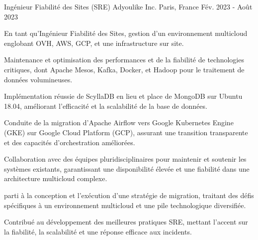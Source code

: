 \begin{cventries}
          \cventry
            {Ingénieur Fiabilité des Sites (SRE)} %
            {Adyoulike Inc.} %
            {Paris, France} %
            {Fév. 2023 - Août 2023} %
            {
              \begin{cvitems} %
                \item {En tant qu'Ingénieur Fiabilité des Sites, gestion d'un environnement multicloud englobant OVH, AWS, GCP, et une infrastructure sur site.}
                \item {Maintenance et optimisation des performances et de la fiabilité de technologies critiques, dont Apache Mesos, Kafka, Docker, et Hadoop pour le traitement de données volumineuses.}
                \item {Implémentation réussie de ScyllaDB en lieu et place de  MongoDB sur Ubuntu 18.04, améliorant l'efficacité et la scalabilité de la base de données.}
                \item {Conduite de la migration d'Apache Airflow vers Google Kubernetes Engine (GKE) sur Google Cloud Platform (GCP), assurant une transition transparente et des capacités d'orchestration améliorées.}
                \item {Collaboration avec des équipes pluridisciplinaires pour maintenir et soutenir les systèmes existants, garantissant une disponibilité élevée et une fiabilité dans une architecture multicloud complexe.}
                \item {parti à la  conception et l'exécution d'une stratégie de migration, traitant des défis spécifiques à un environnement multicloud et une pile technologique diversifiée.}
                \item {Contribué au développement des meilleures pratiques SRE, mettant l'accent sur la fiabilité, la scalabilité et une réponse efficace aux incidents.}
              \end{cvitems}
              
            }


\end{cventries}
